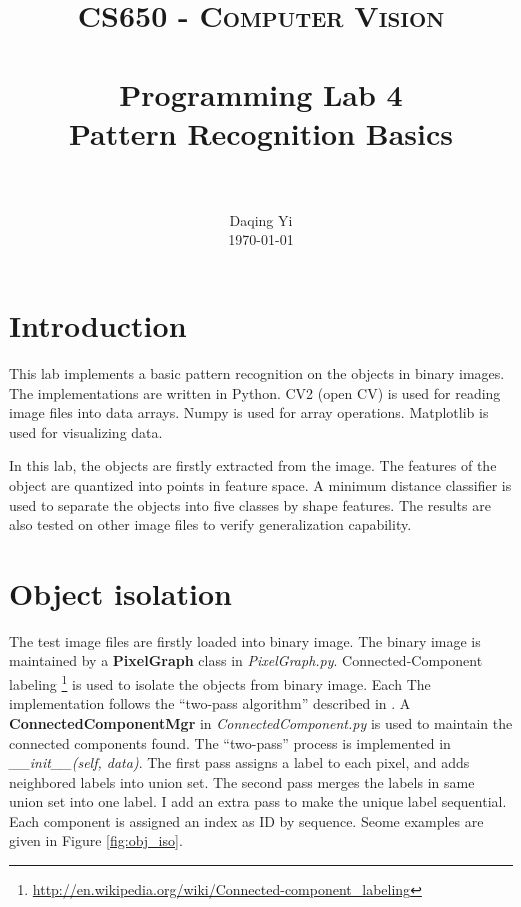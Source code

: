 \documentclass[paper=a4, fontsize=11pt]{scrartcl}
\title{
		\usefont{OT1}{bch}{b}{n}
		\normalfont \normalsize \textsc{CS650 - Computer Vision} \\ [25pt]
		\horrule{0.5pt} \\[0.4cm]
		\huge Programming Lab 4 \\ Pattern Recognition Basics \\
		\horrule{2pt} \\[0.5cm]
}
\author{
		\normalfont 								\normalsize
        Daqing Yi\\[-3pt]		\normalsize
        \today
}
\date{}
\begin{document}
\maketitle

\section{Introduction}
\label{sec:intro}

This lab implements a basic pattern recognition on the objects in binary images.
The implementations are written in Python.
CV2 (open CV) is used for reading image files into data arrays.
Numpy is used for array operations.
Matplotlib is used for visualizing data.

In this lab, the objects are firstly extracted from the image.
The features of the object are quantized into points in feature space.
A minimum distance classifier is used to separate the objects into five classes by shape features.
The results are also tested on other image files to verify generalization capability.

\section{Object isolation}
\label{sec:object_isolation}

The test image files are firstly loaded into binary image.
The binary image is maintained by a \textbf{PixelGraph} class in \emph{PixelGraph.py}.
Connected-Component labeling \footnote{\url{http://en.wikipedia.org/wiki/Connected-component_labeling}}
is used to isolate the objects from binary image.
Each 
The implementation follows the ``two-pass algorithm'' described in \cite{wiki:connected_component_labeling}.
A \textbf{ConnectedComponentMgr} in \emph{ConnectedComponent.py} is used to maintain the connected components found.
The ``two-pass'' process is implemented in \emph{\_\_init\_\_(self, data)}.
The first pass assigns a label to each pixel, and adds neighbored labels into union set.
The second pass merges the labels in same union set into one label.
I add an extra pass to make the unique label sequential. 
Each component is assigned an index as ID by sequence.
Seome examples are given in Figure \ref{fig:obj_iso}.
\end{document}
